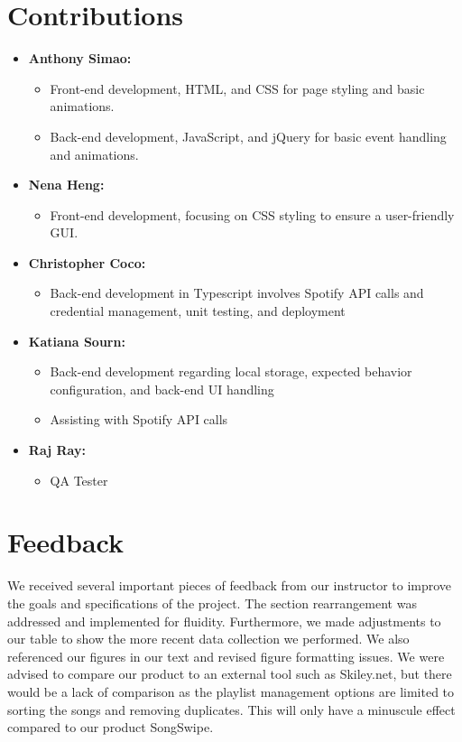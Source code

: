 \documentclass{article}
\begin{document}
\begin{appendices}
    \renewcommand{\thesection}{Appendix \Alph{section}:}
\section{Contributions}
\begin{itemize}
     \item \textbf{Anthony Simao:}
        \begin{itemize}
            \item Front-end development, HTML, and CSS for page styling and basic animations.
            \item Back-end development, JavaScript, and jQuery for basic event handling and animations.
        \end{itemize}
    \item \textbf{Nena Heng:}
        \begin{itemize}
            \item Front-end development, focusing on CSS styling to ensure a user-friendly GUI.
        \end{itemize}
    \item \textbf{Christopher Coco:}
        \begin{itemize}
            \item Back-end development in Typescript involves Spotify API calls and credential management, unit testing, and deployment
        \end{itemize}
    \item \textbf{Katiana Sourn:}
        \begin{itemize}
            \item Back-end development regarding local storage, expected behavior configuration, and back-end UI handling
            \item Assisting with Spotify API calls
        \end{itemize}
    \item \textbf{Raj Ray:}
        \begin{itemize}
            \item QA Tester
        \end{itemize}      
\end{itemize}
\section{Feedback}
\quad We received several important pieces of feedback from our instructor to improve the goals and specifications of the project. The section rearrangement was addressed and implemented for fluidity. Furthermore, we made adjustments to our table to show the more recent data collection we performed. We also referenced our figures in our text and revised figure formatting issues. We were advised to compare our product to an external tool such as Skiley.net, but there would be a lack of comparison as the playlist management options are limited to sorting the songs and removing duplicates. This will only have a minuscule effect compared to our product SongSwipe. \\


\end{appendices}
\end{document}
